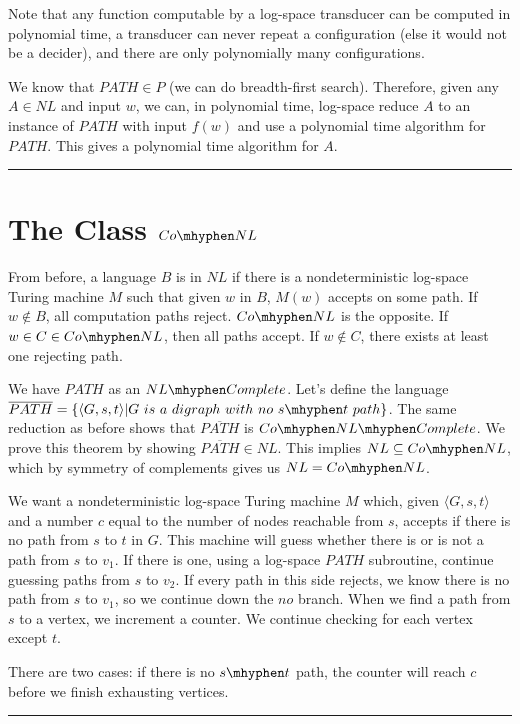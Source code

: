 \documentclass[twoside]{article}
\newenvironment{proof}{{\bf Proof:}}{\hfill\rule{2mm}{2mm}}
\begin{document}
Note that any function computable by a log-space transducer can be computed in polynomial time, a transducer can never repeat a configuration (else it would not be a decider), and there are only polynomially many configurations.


\begin{proof}
	We know that $PATH \in P$ (we can do breadth-first search). Therefore, given any $A\in NL$ and input $w$, we can, in polynomial time, log-space reduce $A$ to an instance of $PATH$ with input $f(w)$ and use a polynomial time algorithm for $PATH$.  This gives a polynomial time algorithm for $A$.
\end{proof}
	



\section*{The Class $Co\mhyphen NL$}


From before, a language $B$ is in $NL$ if there is a nondeterministic log-space Turing machine $M$ such that given $w$ in $B$, $M(w)$ accepts on some path.  If $w\notin B$, all computation paths reject.  $Co\mhyphen NL$ is the opposite.  If $w\in C\in Co\mhyphen NL$, then all paths accept.  If $w\notin C$, there exists at least one rejecting path.



\begin{proof}
	
	We have $PATH$ as an $NL\mhyphen Complete$.  Let's define the language $\overline{PATH} = \{ \langle G,s,t\rangle | G \ is \ a \ digraph \ with \ no \ s\mhyphen t \ path    \}$.  The same reduction as before shows that $\overline{PATH}$ is $Co\mhyphen NL\mhyphen Complete$.  We prove this theorem by showing $\overline{PATH}\in NL$.  This implies $NL\subseteq Co\mhyphen NL$, which by symmetry of complements gives us $NL = Co\mhyphen NL$.
	
	We want a nondeterministic log-space Turing machine $M$ which, given $\langle G,s,t \rangle$ and a number $c$ equal to the number of nodes reachable from $s$, accepts if there is no path from $s$ to $t$ in $G$.  This machine will guess whether there is or is not a path from $s$ to $v_1$.  If there is one, using a log-space $PATH$ subroutine, continue guessing paths from $s$ to $v_2$.  If every path in this side rejects, we know there is no path from $s$ to $v_1$, so we continue down the $no$ branch.  When we find a path from $s$ to a vertex, we increment a counter.  We continue checking for each vertex except $t$.
	
	There are two cases: if there is no $s\mhyphen t$ path, the counter will reach $c$ before we finish exhausting vertices.
	
	
	
\end{proof}
\end{document}
